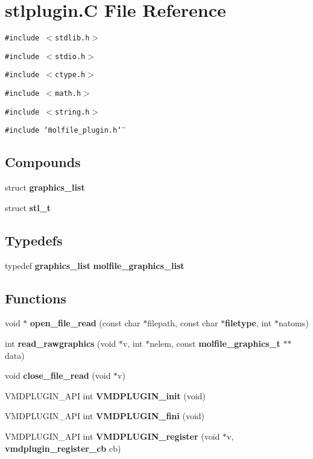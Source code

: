 \section{stlplugin.C File Reference}
\label{stlplugin_8C}
{\tt \#include $<$stdlib.h$>$}\par
{\tt \#include $<$stdio.h$>$}\par
{\tt \#include $<$ctype.h$>$}\par
{\tt \#include $<$math.h$>$}\par
{\tt \#include $<$string.h$>$}\par
{\tt \#include \char`\"{}molfile\_\-plugin.h\char`\"{}}\par
\subsection*{Compounds}
\begin{CompactItemize}
\item 
struct {\bf graphics\_\-list}
\item 
struct {\bf stl\_\-t}
\end{CompactItemize}
\subsection*{Typedefs}
\begin{CompactItemize}
\item 
typedef {\bf graphics\_\-list} {\bf molfile\_\-graphics\_\-list}
\end{CompactItemize}
\subsection*{Functions}
\begin{CompactItemize}
\item 
void $\ast$ {\bf open\_\-file\_\-read} (const char $\ast$filepath, const char $\ast${\bf filetype}, int $\ast$natoms)
\item 
int {\bf read\_\-rawgraphics} (void $\ast$v, int $\ast$nelem, const {\bf molfile\_\-graphics\_\-t} $\ast$$\ast$data)
\item 
void {\bf close\_\-file\_\-read} (void $\ast$v)
\item 
VMDPLUGIN\_\-API int {\bf VMDPLUGIN\_\-init} (void)
\item 
VMDPLUGIN\_\-API int {\bf VMDPLUGIN\_\-fini} (void)
\item 
VMDPLUGIN\_\-API int {\bf VMDPLUGIN\_\-register} (void $\ast$v, {\bf vmdplugin\_\-register\_\-cb} cb)
\end{CompactItemize}
